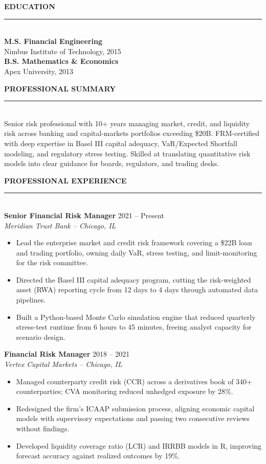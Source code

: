 \documentclass[10pt]{article}
\newcommand{\sectionhead}[1]{%
  \par\vspace{5pt}
  {\color{navy}\fontsize{10.5}{12}\selectfont\bfseries\MakeUppercase{#1}}\\[1pt]
  {\color{gold}\rule{\linewidth}{1pt}}\\[4pt]%
}
\newcommand{\role}[3]{%
  \textbf{\color{navy}#1} \hfill {\small\color{slate}#3}\\
  {\small\itshape\color{gold!55!navy}#2}\\[2pt]%
}
\begin{document}
\begin{minipage}[t]{0.335\linewidth}
\sectionhead{Education}
\textbf{\small\color{navy}M.S. Financial Engineering}\\
{\footnotesize\color{slate}Nimbus Institute of Technology, 2015}\\[4pt]
\textbf{\small\color{navy}B.S. Mathematics \& Economics}\\
{\footnotesize\color{slate}Apex University, 2013}

\end{minipage}%
\hfill
\begin{minipage}[t]{0.625\linewidth}

\sectionhead{Professional Summary}
{\small Senior risk professional with 10+ years managing market, credit, and liquidity risk across banking and capital-markets portfolios exceeding \$20B. FRM-certified with deep expertise in Basel III capital adequacy, VaR/Expected Shortfall modeling, and regulatory stress testing. Skilled at translating quantitative risk models into clear guidance for boards, regulators, and trading desks.}

\sectionhead{Professional Experience}

\role{Senior Financial Risk Manager}{Meridian Trust Bank -- Chicago, IL}{2021 -- Present}
{\small
\begin{itemize}
\item Lead the enterprise market and credit risk framework covering a \$22B loan and trading portfolio, owning daily VaR, stress testing, and limit-monitoring for the risk committee.
\item Directed the Basel III capital adequacy program, cutting the risk-weighted asset (RWA) reporting cycle from 12 days to 4 days through automated data pipelines.
\item Built a Python-based Monte Carlo simulation engine that reduced quarterly stress-test runtime from 6 hours to 45 minutes, freeing analyst capacity for scenario design.
\end{itemize}
}

\role{Financial Risk Manager}{Vertex Capital Markets -- Chicago, IL}{2018 -- 2021}
{\small
\begin{itemize}
\item Managed counterparty credit risk (CCR) across a derivatives book of 340+ counterparties; CVA monitoring reduced unhedged exposure by 28\%.
\item Redesigned the firm's ICAAP submission process, aligning economic capital models with supervisory expectations and passing two consecutive reviews without findings.
\item Developed liquidity coverage ratio (LCR) and IRRBB models in R, improving forecast accuracy against realized outcomes by 19\%.
\end{itemize}
}


\end{minipage}
\end{document}
